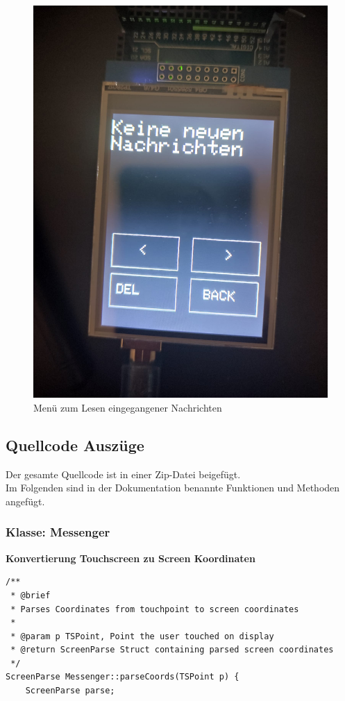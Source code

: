 \documentclass[a4paper, 11pt]{scrartcl}
\begin{document}
\begin{small}
\begin{figure}[H]
    \begin{center}
        \includegraphics[scale=0.13]{Bilder/read_menu.jpeg}
        \caption{Menü zum Lesen eingegangener Nachrichten}\label{pic:read_menu}
    \end{center}
\end{figure}

\newpage
\subsection{Quellcode Auszüge}\label{ch:codeschnipsel}
Der gesamte Quellcode ist in einer Zip-Datei beigefügt.
\\
Im Folgenden sind in der Dokumentation benannte Funktionen und Methoden angefügt.

\subsubsection{Klasse: Messenger}
\textbf{Konvertierung Touchscreen zu Screen Koordinaten}\label{code:screenparse}
\begin{lstlisting}
/**
 * @brief 
 * Parses Coordinates from touchpoint to screen coordinates
 * 
 * @param p TSPoint, Point the user touched on display
 * @return ScreenParse Struct containing parsed screen coordinates
 */
ScreenParse Messenger::parseCoords(TSPoint p) {
    ScreenParse parse;
    

\end{lstlisting}
\end{small}
\end{document}
